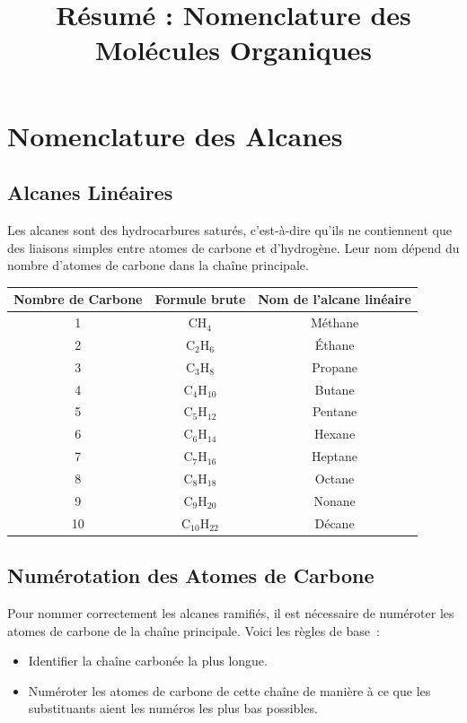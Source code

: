\documentclass[12pt]{article}
\title{Résumé : Nomenclature des Molécules Organiques}
\author{}
\date{}
\begin{document}
\maketitle

\section{Nomenclature des Alcanes}

\subsection{Alcanes Linéaires}
Les alcanes sont des hydrocarbures saturés, c'est-à-dire qu'ils ne contiennent que des liaisons simples entre atomes de carbone et d'hydrogène. Leur nom dépend du nombre d'atomes de carbone dans la chaîne principale.

\begin{center}
\begin{tabular}{|c|c|c|}
\hline
Nombre de Carbone & Formule brute & Nom de l'alcane linéaire \\ \hline
1 & $\mathrm{CH_4}$ & Méthane \\ \hline
2 & $\mathrm{C_2H_6}$ & Éthane \\ \hline
3 & $\mathrm{C_3H_8}$ & Propane \\ \hline
4 & $\mathrm{C_4H_{10}}$ & Butane \\ \hline
5 & $\mathrm{C_5H_{12}}$ & Pentane \\ \hline
6 & $\mathrm{C_6H_{14}}$ & Hexane \\ \hline
7 & $\mathrm{C_7H_{16}}$ & Heptane \\ \hline
8 & $\mathrm{C_8H_{18}}$ & Octane \\ \hline
9 & $\mathrm{C_9H_{20}}$ & Nonane \\ \hline
10 & $\mathrm{C_{10}H_{22}}$ & Décane \\ \hline
\end{tabular}
\end{center}

\subsection{Numérotation des Atomes de Carbone}
Pour nommer correctement les alcanes ramifiés, il est nécessaire de numéroter les atomes de carbone de la chaîne principale. Voici les règles de base~:
\begin{itemize}
    \item Identifier la chaîne carbonée la plus longue.
    \item Numéroter les atomes de carbone de cette chaîne de manière à ce que les substituants aient les numéros les plus bas possibles.
\end{itemize}
\end{document}
